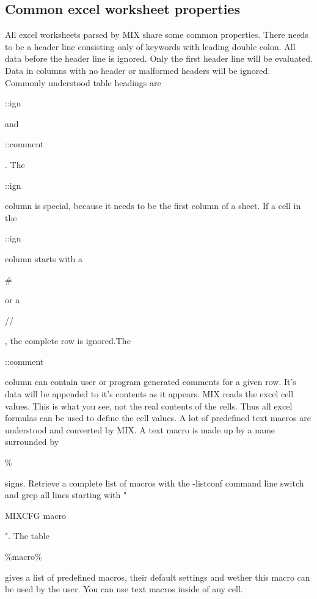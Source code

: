 \documentclass[a4paper,12pt]{article}
\begin{document}
\subsection{Common excel worksheet properties}
All excel worksheets parsed by MIX share some common properties.
There needs to be a header line consisting only of keywords with leading double colon. All data before the header line is ignored. Only the first header line will be evaluated. Data in columns with no header or malformed headers will be ignored.\newline
Commonly understood table headings are \begin{tt}::ign\end{tt} and \begin{tt}::comment\end{tt}. The \begin{tt}::ign\end{tt} column is special, because it needs to be the first column of a sheet. If a cell in the \begin{tt}::ign\end{tt} column starts with a \begin{tt}\#\end{tt} or a \begin{tt}//\end{tt}, the complete row is ignored.The \begin{tt}::comment\end{tt} column can contain user or program generated comments for a given row. It's data will be appended to it's contents as it appears.\newline
MIX reads the excel cell values. This is what you see, not the real contents of the cells. Thus all excel formulas can be used to define the cell values.\newline
A lot of predefined text macros are understood and converted by MIX. A text macro is made up by a name surrounded by \begin{tt}\%\end{tt} signs. Retrieve a complete list of macros with the -listconf command line switch and grep all lines starting with "\begin{tt}MIXCFG macro\end{tt}". The table \begin{tt}\%macro\%\end{tt} gives a list of predefined macros, their default settings and wether this macro can be used by the user. You can use text macros inside of any cell.\\
\end{document}
